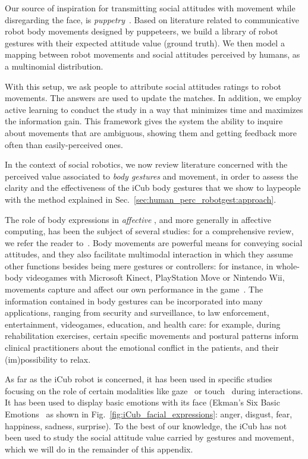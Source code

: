 Our source of inspiration for transmitting social attitudes with movement while disregarding the face, is \emph{puppetry}~\cite{li:2011:ijsr}. Based on literature related to communicative robot body movements designed by puppeteers, we build a library of robot gestures with their expected attitude value (ground truth). We then model a mapping between robot movements and social attitudes perceived by humans, as a multinomial distribution.

With this setup, we ask people to attribute social attitudes ratings to robot movements. The answers are used to update the \gestatt{} matches. In addition, we employ active learning to conduct the study in a way that minimizes time and maximizes the information gain. This framework gives the system the ability to inquire about movements that are ambiguous, showing them and getting feedback more often than easily-perceived ones.

In the context of social robotics, we now review literature concerned with the perceived value associated to \emph{body gestures} and movement, in order to assess the clarity and the effectiveness of the iCub body gestures that we show to laypeople with the method explained in Sec.~\ref{sec:human_perc_robotgest:approach}.

The role of body expressions in \emph{affective \hri{}}, and more generally in affective computing, has been the subject of several studies: for a comprehensive review, we refer the reader to~\cite{kleinsmith:2013:survey}. Body movements are powerful means for conveying social attitudes, and they also facilitate multimodal interaction in which they assume other functions besides being mere gestures or controllers: for instance, in whole-body videogames with Microsoft Kinect, PlayStation Move or Nintendo Wii, movements capture and affect our own performance in the game~\cite{bianchi:2013:hci}. The information contained in body gestures can be incorporated into many applications, ranging from security and surveillance, to law enforcement, entertainment, videogames, education, and health care: for example, during rehabilitation exercises, certain specific movements and postural patterns inform clinical practitioners about the emotional conflict in the patients, and their (im)possibility to relax.

As far as the iCub robot is concerned, it has been used in specific \hri{} studies focusing on the role of certain modalities like gaze~\cite{boucher:2012:fnbot} or touch~\cite{argall:2010:icdl} during interactions.
It has been used to display basic emotions with its face (Ekman's Six Basic Emotions~\cite{ekman:1972} as shown in Fig.~\ref{fig:iCub_facial_expressions}: anger, disgust, fear, happiness, sadness, surprise).
To the best of our knowledge, the iCub has not been used to study the social attitude value carried by gestures and movement, which we will do in the remainder of this appendix.

